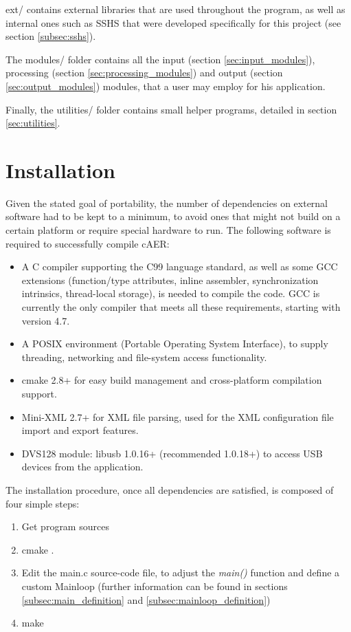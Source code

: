 \documentclass[a4paper,12pt]{report}
\begin{document}
ext/ contains external libraries that are used throughout the program, as well as internal ones such as SSHS that were developed specifically for this project (see section \ref{subsec:sshs}).

The modules/ folder contains all the input (section \ref{sec:input_modules}), processing (section \ref{sec:processing_modules}) and output (section \ref{sec:output_modules}) modules, that a user may employ for his application.

Finally, the utilities/ folder contains small helper programs, detailed in section \ref{sec:utilities}.

\section{Installation} \label{sec:installation}

Given the stated goal of portability, the number of dependencies on external software had to be kept to a minimum, to avoid ones that might not build on a certain platform or require special hardware to run.
\clearpage
The following software is required to successfully compile cAER:
\begin{itemize}
\item A C compiler supporting the C99 language standard, as well as some GCC extensions (function/type attributes, inline assembler, synchronization intrinsics, thread-local storage), is needed to compile the code. GCC is currently the only compiler that meets all these requirements, starting with version 4.7.
\item A POSIX environment (Portable Operating System Interface), to supply threading, networking and file-system access functionality.
\item cmake 2.8+ for easy build management and cross-platform compilation support.
\item Mini-XML 2.7+ for XML file parsing, used for the XML configuration file import and export features.
\item DVS128 module: libusb 1.0.16+ (recommended 1.0.18+) to access USB devices from the application.
\end{itemize}

The installation procedure, once all dependencies are satisfied, is composed of four simple steps:
\begin{enumerate}
\item Get program sources
\item cmake .
\item Edit the main.c source-code file, to adjust the \emph{main()} function and define a custom Mainloop (further information can be found in sections \ref{subsec:main_definition} and \ref{subsec:mainloop_definition})
\item make
\end{enumerate}
\end{document}

